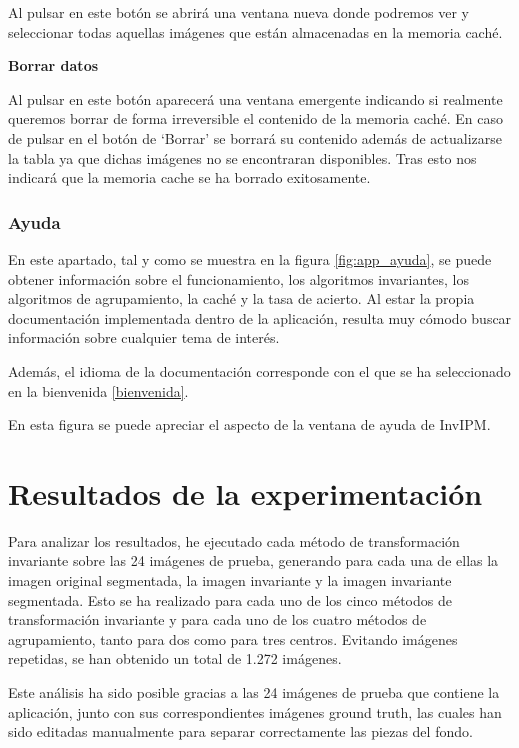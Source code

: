 Al pulsar en este botón se abrirá una ventana nueva donde podremos ver y seleccionar todas aquellas imágenes que están almacenadas en la memoria caché.

\textbf{Borrar datos}\label{borrar-datos}

Al pulsar en este botón aparecerá una ventana emergente indicando si realmente queremos borrar de forma irreversible el contenido de la memoria caché. En caso de pulsar en el botón de `Borrar' se borrará su contenido además de actualizarse la tabla ya que dichas imágenes no se encontraran disponibles. Tras esto nos indicará que la memoria cache se ha borrado exitosamente.

\subsubsection{Ayuda}\label{ayuda}

En este apartado, tal y como se muestra en la figura \ref{fig:app_ayuda}, se puede obtener información sobre el funcionamiento, los algoritmos invariantes, los algoritmos de agrupamiento, la caché y la tasa de acierto. Al estar la propia documentación implementada dentro de la aplicación, resulta muy cómodo buscar información sobre cualquier tema de interés. 

Además, el idioma de la documentación corresponde con el que se ha seleccionado en la bienvenida \ref{bienvenida}.


En esta figura se puede apreciar el aspecto de la ventana de ayuda de InvIPM.

\section{Resultados de la experimentación}\label{resultados-de-la-experimentación}

Para analizar los resultados, he ejecutado cada método de transformación invariante sobre las 24 imágenes de prueba, generando para cada una de ellas la imagen original segmentada, la imagen invariante y la imagen invariante segmentada. Esto se ha realizado para cada uno de los cinco métodos de transformación invariante y para cada uno de los cuatro métodos de agrupamiento, tanto para dos como para tres centros. Evitando imágenes repetidas, se han obtenido un total de 1.272 imágenes.

Este análisis ha sido posible gracias a las 24 imágenes de prueba que contiene la aplicación, junto con sus correspondientes imágenes ground truth, las cuales han sido editadas manualmente para separar correctamente las piezas del fondo.

